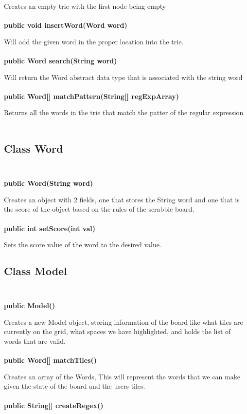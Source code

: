 \documentclass[11pt]{article}
\begin{document}
Creates an empty trie with the first node being empty\\\\
\textbf{public void insertWord(Word word)\\}

Will add the given word in the proper location into the trie.\\\\
%
\textbf{public Word search(String word)\\}

Will return the Word abstract data type that is associated with the string word\\\\
\textbf{public Word[] matchPattern(String[] regExpArray)\\}

Returns all the words in the trie that match the patter of the regular expression\\\\
%
\subsection{Class Word \\\\}
\textbf{public Word(String word)\\}

Creates an object with 2 fields, one that stores the String word and one that is the score of the object based on the rules of the scrabble board.\\\\

\textbf{public int setScore(int val)}

Sets the score value of the word to the desired value.
%
\subsection{Class Model \\\\}
\textbf{public Model()\\}

Creates a new Model object, storing information of the board like what tiles are currently on the grid, what spaces we have highlighted, and holds the list of words that are valid.\\\\
%
\textbf{public Word[] matchTiles()\\}

Creates an array of the Words, This will represent the words that we can make given the state of the board and the users tiles.\\\\
\textbf{public String[] createRegex()\\}
\end{document}

